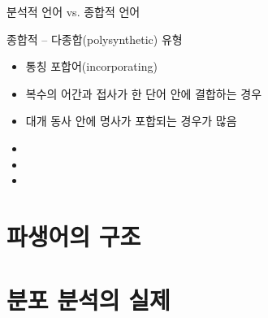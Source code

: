 \documentclass[11pt, aspectratio=169]{beamer}
\newcommand{\texttnr}[1]{{\tnrfont #1}}
\begin{document}
\begin{frame}[t]{분석적 언어 vs. 종합적 언어}
  \begin{block}{종합적 – 다종합(polysynthetic) 유형}
    \begin{itemize}
      \item 통칭 포합어(incorporating) 
      \item 복수의 어간과 접사가 한 단어 안에 결합하는 경우
      \item 대개 동사 안에 명사가 포합되는 경우가 많음
    \end{itemize}
  \end{block}
  
  \begin{itemize}
    \item 
    \item 
    \item 
  \end{itemize}
\end{frame}


\section{파생어의 구조}

\section{분포 분석의 실제}

\end{document}
